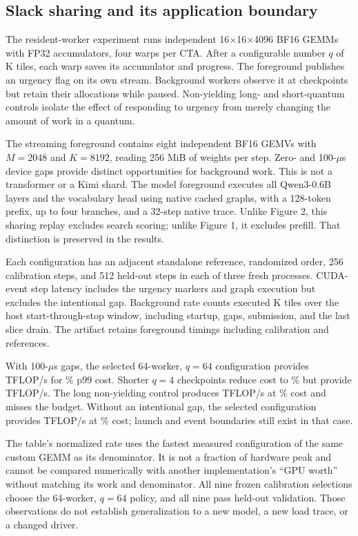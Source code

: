 \subsection{Slack sharing and its application boundary}
The resident-worker experiment runs independent 16$\times$16$\times$4096
BF16 GEMMs with FP32 accumulators, four warps per CTA. After a configurable
number $q$ of K tiles, each warp saves its accumulator and progress. The
foreground publishes an urgency flag on its own stream. Background workers
observe it at checkpoints but retain their allocations while paused.
Non-yielding long- and short-quantum controls isolate the effect of responding
to urgency from merely changing the amount of work in a quantum.

The streaming foreground contains eight independent BF16 GEMVs with
$M=2048$ and $K=8192$, reading 256 MiB of weights per step. Zero- and
100-$\mu$s device gaps provide distinct opportunities for background work.
This is not a transformer or a Kimi shard. The model foreground executes
all Qwen3-0.6B layers and the vocabulary head using native cached graphs,
with a 128-token prefix, up to four branches, and a 32-step native trace.
Unlike Figure 2, this sharing replay excludes search scoring; unlike
Figure 1, it excludes prefill. That distinction is preserved in the results.

Each configuration has an adjacent standalone reference, randomized order,
256 calibration steps, and 512 held-out steps in each of three fresh
processes. CUDA-event step latency includes the urgency markers and graph
execution but excludes the intentional gap. Background rate counts executed
K tiles over the host start-through-stop window, including startup, gaps,
submission, and the last slice drain. The artifact retains
\slackTimedSteps{} foreground timings including calibration and references.



With 100-$\mu$s gaps, the selected 64-worker, $q=64$ configuration provides
\slackProxyMediumRate{} TFLOP/s for \slackProxyMediumCost\% p99 cost.
Shorter $q=4$ checkpoints reduce cost to \slackProxyShortCost\% but provide
\slackProxyShortRate{} TFLOP/s. The long non-yielding control produces
\slackProxyLongRate{} TFLOP/s at \slackProxyLongCost\% cost and misses
the budget. Without an intentional gap, the selected configuration provides
\slackContinuousRate{} TFLOP/s at \slackContinuousCost\% cost; launch
and event boundaries still exist in that case.

The table's normalized rate uses the fastest measured configuration of the
same custom GEMM as its denominator. It is not a fraction of hardware peak
and cannot be compared numerically with another implementation's ``GPU
worth'' without matching its work and denominator. All nine frozen
calibration selections choose the 64-worker, $q=64$ policy, and all nine
pass held-out validation. Those observations do not establish generalization
to a new model, a new load trace, or a changed driver.

